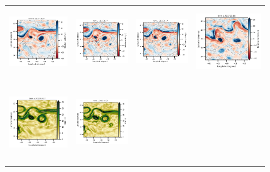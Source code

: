 \begin{figure}[ht!]
\begin{center}
\begin{tabular}{cccc}
\includegraphics[trim={0 13mm 21.2mm 5mm},clip, width=3.60cm,height=3cm]{00_Oceanbench/content/figures/fourdvarnet_figs/osse_gf_nadir_vort_r.png} &
\includegraphics[trim={13mm 13mm 21.2mm 5mm},clip, width=3.2cm,height=3cm]{00_Oceanbench/content/figures/fourdvarnet_figs/osse_gf_nadirswot_vort_r.png} &
\includegraphics[trim={13mm 13mm 21.2mm 5mm},clip, width=3.2cm,height=3cm]{00_Oceanbench/content/figures/fourdvarnet_figs/osse_gf_nadir_sst_vort_r.png} &
\includegraphics[trim={13mm 13mm 0 5mm},clip,width=4.0cm,height=3cm]{00_Oceanbench/content/figures/fourdvarnet_figs/ose_gf_vort_r.png} \\
\includegraphics[trim={0 0 19mm 5mm},clip, width=3.60cm,height=3.4cm]{00_Oceanbench/content/figures/fourdvarnet_figs/osse_gf_nadir_strain.png} &
\includegraphics[trim={13mm 0 19mm 5mm},clip, width=3.2cm,height=3.4cm]{00_Oceanbench/content/figures/fourdvarnet_figs/osse_gf_nadirswot_strain.png} &

\end{tabular}
\end{center}
\end{figure}
